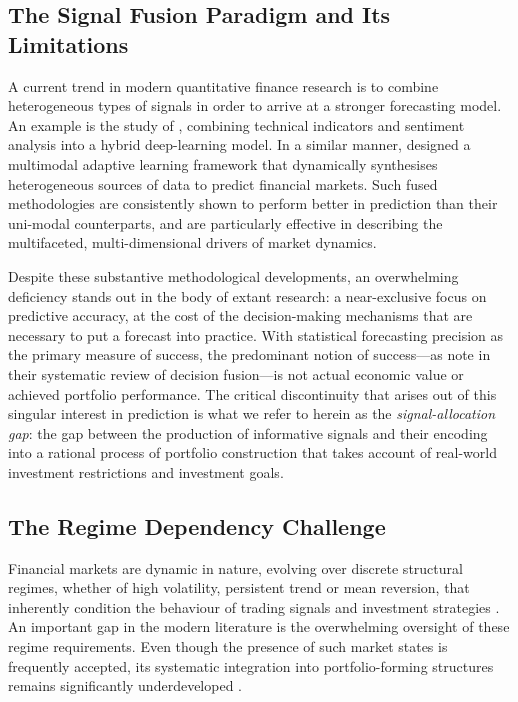 \subsection{The Signal Fusion Paradigm and Its Limitations}

A current trend in modern quantitative finance research is to combine heterogeneous
types of signals in order to arrive at a stronger forecasting model. An example is the
study of \citet{moodi24}, combining technical indicators and sentiment analysis into a
hybrid deep-learning model. In a similar manner, \citet{farimani24} designed a multimodal
adaptive learning framework that dynamically synthesises heterogeneous sources of data to
predict financial markets. Such fused methodologies are consistently shown to perform
better in prediction than their uni-modal counterparts, and are particularly effective in
describing the multifaceted, multi-dimensional drivers of market dynamics.

Despite these substantive methodological developments, an overwhelming deficiency stands
out in the body of extant research: a near-exclusive focus on predictive accuracy, at the
cost of the decision-making mechanisms that are necessary to put a forecast into
practice. With statistical forecasting precision as the primary measure of success, the
predominant notion of success---as \citet{zhang22} note in their systematic review of
decision fusion---is not actual economic value or achieved portfolio performance. The
critical discontinuity that arises out of this singular interest in prediction is what we
refer to herein as the \emph{signal-allocation gap}: the gap between the production of
informative signals and their encoding into a rational process of portfolio construction
that takes account of real-world investment restrictions and investment goals.

\subsection{The Regime Dependency Challenge}

Financial markets are dynamic in nature, evolving over discrete structural regimes,
whether of high volatility, persistent trend or mean reversion, that inherently
condition the behaviour of trading signals and investment strategies \citep{wang19}. An
important gap in the modern literature is the overwhelming oversight of these regime
requirements. Even though the presence of such market states is frequently accepted, its
systematic integration into portfolio-forming structures remains significantly
underdeveloped \citep{kritzman12}.

